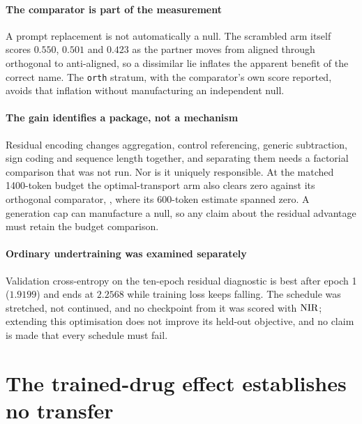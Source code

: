 \paragraph{The comparator is part of the measurement} A prompt replacement is not
automatically a null. The scrambled arm itself scores $0.550$, $0.501$ and
$0.423$ as the partner moves from aligned through orthogonal to anti-aligned, so
a dissimilar lie inflates the apparent benefit of the correct name. The
\texttt{orth} stratum, with the comparator's own score reported, avoids that
inflation without manufacturing an independent null.

\paragraph{The gain identifies a package, not a mechanism} Residual encoding
changes aggregation, control referencing, generic subtraction, sign coding and
sequence length together, and separating them needs a factorial comparison that
was not run. Nor is it uniquely responsible. At the matched \num{1400}-token
budget the optimal-transport arm also clears zero against its orthogonal
comparator, , where its $600$-token estimate
spanned zero. A generation cap can manufacture a null, so any claim about the
residual advantage must retain the budget comparison.

\paragraph{Ordinary undertraining was examined separately} Validation
cross-entropy on the ten-epoch residual diagnostic is best after epoch 1
($1.9199$) and ends at $2.2568$ while training loss keeps falling. The schedule
was stretched, not continued, and no checkpoint from it was scored with $\textrm{NIR}$;
extending this optimisation does not improve its held-out objective, and no claim
is made that every schedule must fail.

\section{The trained-drug effect establishes no transfer}

